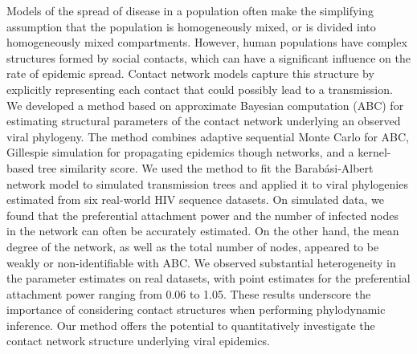 Models of the spread of disease in a population often make the simplifying
assumption that the population is homogeneously mixed, or is divided into
homogeneously mixed compartments. However, human populations have complex
structures formed by social contacts, which can have a significant influence on
the rate of epidemic spread. Contact network models capture this structure by
explicitly representing each contact that could possibly lead to a
transmission. We developed a method based on approximate Bayesian computation
(ABC) for estimating structural parameters of the contact network underlying an
observed viral phylogeny. The method combines adaptive sequential Monte Carlo
for ABC, Gillespie simulation for propagating epidemics though networks, and a
kernel-based tree similarity score. We used the method to fit the
Barab\'{a}si-Albert network model to simulated transmission trees and applied
it to viral phylogenies estimated from six real-world HIV sequence datasets. On
simulated data, we found that the preferential attachment power and the number
of infected nodes in the network can often be accurately estimated. On the
other hand, the mean degree of the network, as well as the total number of
nodes, appeared to be weakly or non-identifiable with ABC. We observed
substantial heterogeneity in the parameter estimates on real datasets, with
point estimates for the preferential attachment power ranging from 0.06 to
1.05. These results underscore the importance of considering contact structures
when performing phylodynamic inference. Our method offers the potential to
quantitatively investigate the contact network structure underlying viral
epidemics.
